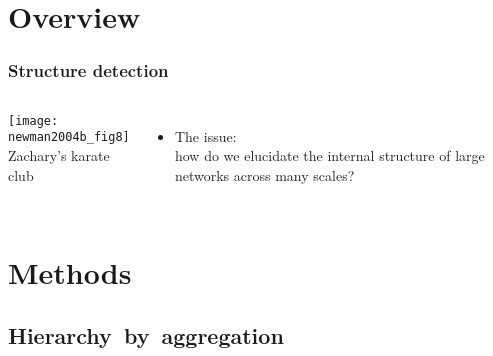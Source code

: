 \section{Overview}

\begin{frame}
  \frametitle{Structure detection}

  \begin{columns}
    \texttt{[image: newman2004b\_fig8]} \\
    {\small {} Zachary's karate club\cite{zachary1977a,newman2004b}}
    \begin{itemize}
    \item 
      \alert{The issue:}\\
      how do we elucidate
      the internal structure of
      large networks across many
      scales?
    \end{itemize}
  \end{columns}

  \bigskip


\end{frame}


\section{Methods}

\subsection{Hierarchy\ by\ aggregation}

